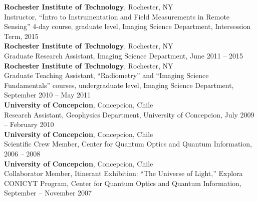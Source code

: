 \documentclass[11pt]{res}
\begin{document}
\begin{resume}
\vspace{0.1in}
{\bf Rochester Institute of Technology}, Rochester, NY\\
Instructor, ``Intro to Instrumentation and Field Measurements in Remote Sensing'' 4-day course, graduate level, Imaging Science Department, Intersession Term, 2015
\vspace{0.1in}\\
{\bf Rochester Institute of Technology}, Rochester, NY\\
Graduate Research Assistant, Imaging Science Department, June 2011 -- 2015
\vspace{0.1in}\\
{\bf Rochester Institute of Technology}, Rochester, NY\\
Graduate Teaching Assistant, ``Radiometry'' and  ``Imaging Science Fundamentals'' courses, undergraduate level, Imaging Science Department, September 2010 -- May 2011
\vspace{0.1in}\\
{\bf University of Concepcion}, Concepcion, Chile\\
Research Assistant, Geophysics Department, University of Concepcion, July 2009 -- February 2010
\vspace{-0.1in}\\
{\bf University of Concepcion}, Concepcion, Chile\\
Scientific Crew Member, Center for Quantum Optics and Quantum Information, 2006 -- 2008
\vspace{0.1in}\\
{\bf University of Concepcion}, Concepcion, Chile\\
Collaborator Member, Itinerant Exhibition: ``The Universe of Light,'' Explora CONICYT Program, Center for Quantum Optics and Quantum Information, September -- November 2007\\

\vspace{-0.2in}

\end{resume}
\end{document}
